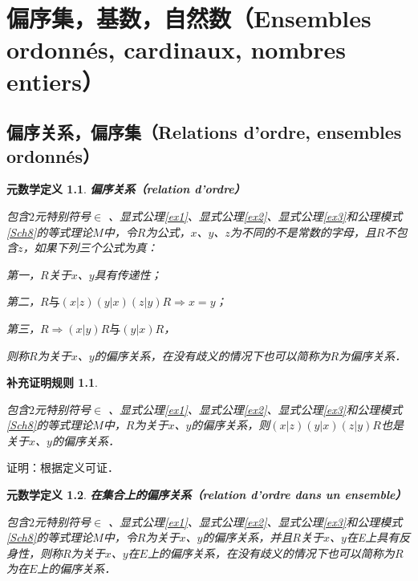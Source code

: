 \documentclass[12pt, a4paper, oneside]{book}
\newtheorem{metadef}{元数学定义}
\newtheorem{Ccor}{补充证明规则}
\begin{document}
	\chapter{偏序集，基数，自然数（Ensembles ordonnés, cardinaux, nombres entiers）}
		\section{偏序关系，偏序集（Relations d'ordre, ensembles ordonnés）}		
			\begin{metadef}
				\textbf{偏序关系（relation d'ordre）}
				\par
				包含$2$元特别符号$\in$ 、显式公理\ref{ex1}、显式公理\ref{ex2}、显式公理\ref{ex3}和公理模式\ref{Sch8}的等式理论$M$中，令$R$为公式，$x$、$y$、$z$为不同的不是常数的字母，且$R$不包含$z$，如果下列三个公式为真：
				\par
				第一，$R$关于$x$、$y$具有传递性；
				\par
				第二，$R\text{与}(x|z)(y|x)(z|y)R\Rightarrow x=y$；
				\par
				第三，$R\Rightarrow (x|y)R\text{与}(y|x)R$，
				\par
				则称$R$为关于$x$、$y$的偏序关系，在没有歧义的情况下也可以简称为$R$为偏序关系．
			\end{metadef}
			
			\begin{Ccor}\label{Ccor68}
				\hfill\par
				包含$2$元特别符号$\in$ 、显式公理\ref{ex1}、显式公理\ref{ex2}、显式公理\ref{ex3}和公理模式\ref{Sch8}的等式理论$M$中，$R$为关于$x$、$y$的偏序关系，则$(x|z)(y|x)(z|y)R$也是关于$x$、$y$的偏序关系．
			\end{Ccor}
			证明：根据定义可证．
			
			\begin{metadef}
				\textbf{在集合上的偏序关系（relation d'ordre dans un ensemble）}
				\par
				包含$2$元特别符号$\in$ 、显式公理\ref{ex1}、显式公理\ref{ex2}、显式公理\ref{ex3}和公理模式\ref{Sch8}的等式理论$M$中，令$R$为关于$x$、$y$的偏序关系，并且$R$关于$x$、$y$在E上具有反身性，则称$R$为关于$x$、$y$在$E$上的偏序关系，在没有歧义的情况下也可以简称为$R$为在$E$上的偏序关系．
			\end{metadef}
\end{document}
